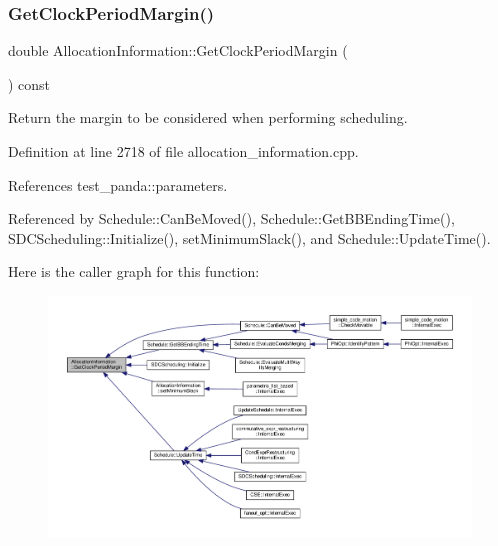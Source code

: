 \subsubsection{\texorpdfstring{Get\+Clock\+Period\+Margin()}{GetClockPeriodMargin()}}
{\footnotesize\ttfamily double Allocation\+Information\+::\+Get\+Clock\+Period\+Margin (\begin{DoxyParamCaption}{ }\end{DoxyParamCaption}) const}



Return the margin to be considered when performing scheduling. 



Definition at line 2718 of file allocation\+\_\+information.\+cpp.



References test\+\_\+panda\+::parameters.



Referenced by Schedule\+::\+Can\+Be\+Moved(), Schedule\+::\+Get\+B\+B\+Ending\+Time(), S\+D\+C\+Scheduling\+::\+Initialize(), set\+Minimum\+Slack(), and Schedule\+::\+Update\+Time().

Here is the caller graph for this function\+:
\nopagebreak
\begin{figure}[H]
\begin{center}
\leavevmode
\includegraphics[width=350pt]{d7/d79/classAllocationInformation_af577557336def6acf7f839f803c4ecc7_icgraph}
\end{center}
\end{figure}
\mbox{\label{classAllocationInformation_a9481db5ab9c2a29958fa5c3da7bfeded}} 
